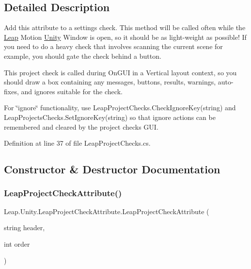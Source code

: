 \subsection{Detailed Description}
Add this attribute to a settings check. This method will be called often while the \mbox{\hyperlink{namespace_leap_1_1_unity_1_1_leap}{Leap}} Motion \mbox{\hyperlink{namespace_leap_1_1_unity}{Unity}} Window is open, so it should be as light-\/weight as possible! If you need to do a heavy check that involves scanning the current scene for example, you should gate the check behind a button. 

This project check is called during On\+G\+UI in a Vertical layout context, so you should draw a box containing any messages, buttons, results, warnings, auto-\/fixes, and ignores suitable for the check.

For \char`\"{}ignore\char`\"{} functionality, use Leap\+Project\+Checks.\+Check\+Ignore\+Key(string) and Leap\+Projects\+Checks.\+Set\+Ignore\+Key(string) so that ignore actions can be remembered and cleared by the project checks G\+UI. 

Definition at line 37 of file Leap\+Project\+Checks.\+cs.



\subsection{Constructor \& Destructor Documentation}
\mbox{\label{class_leap_1_1_unity_1_1_leap_project_check_attribute_a10c673a55ffc82f76eb8631b7a7709aa}} 
\subsubsection{\texorpdfstring{LeapProjectCheckAttribute()}{LeapProjectCheckAttribute()}}
{\footnotesize\ttfamily Leap.\+Unity.\+Leap\+Project\+Check\+Attribute.\+Leap\+Project\+Check\+Attribute (\begin{DoxyParamCaption}\item[{string}]{header,  }\item[{int}]{order }\end{DoxyParamCaption})}



